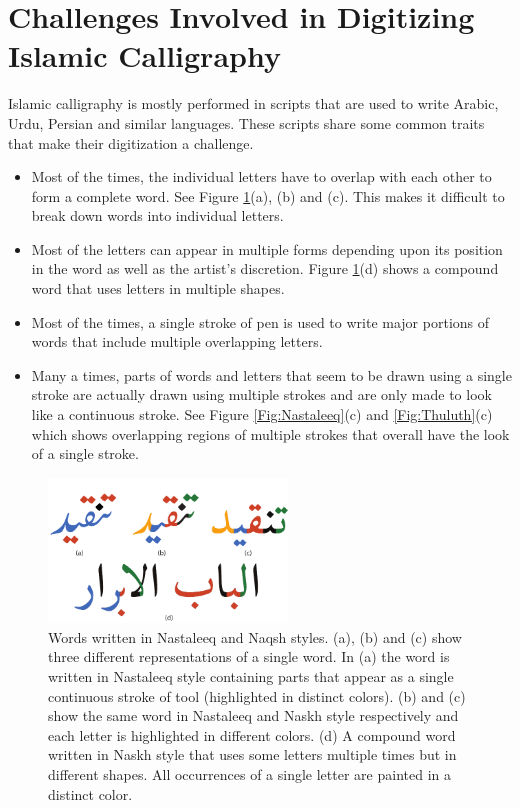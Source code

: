 \section{Challenges Involved in Digitizing Islamic Calligraphy}
\label{Chapter:ScriptComplexities}
{
    \noindent Islamic calligraphy is mostly performed in scripts that are used to write Arabic, Urdu, Persian and similar languages. These scripts share some common traits that make their digitization a challenge.

    \begin{itemize}
    \item Most of the times, the individual letters have to overlap with each other to form a complete word. See Figure \ref{Fig:UrduScriptBreakDown}(a), (b) and (c). This makes it difficult to break down words into individual letters.
    \item Most of the letters can appear in multiple forms depending upon its position in the word as well as the artist's discretion. Figure \ref{Fig:UrduScriptBreakDown}(d) shows a compound word that uses letters in multiple shapes.
    \item Most of the times, a single stroke of pen is used to write major portions of words that include multiple overlapping letters.
    \item Many a times, parts of words and letters that seem to be drawn using a single stroke are actually drawn using multiple strokes and are only made to look like a continuous stroke. See Figure \ref{Fig:Nastaleeq}(c) and \ref{Fig:Thuluth}(c) which shows overlapping regions of multiple strokes that overall have the look of a single stroke.
    \end{itemize}

    \begin{figure}[!t]
        \centering
        \includegraphics[width=2.5in]{../Images/Nuqtah.pdf}
        \caption{Words written in Nastaleeq and Naqsh styles. (a), (b) and (c) show three different representations of a single word. In (a) the word is written in Nastaleeq style containing parts that appear as a single continuous stroke of tool (highlighted in distinct colors). (b) and (c) show the same word in Nastaleeq and Naskh style respectively and each letter is highlighted in different colors. (d) A compound word written in Naskh style that uses some letters multiple times but in different shapes. All occurrences of a single letter are painted in a distinct color.}
        \label{Fig:UrduScriptBreakDown}
    \end{figure}

}
